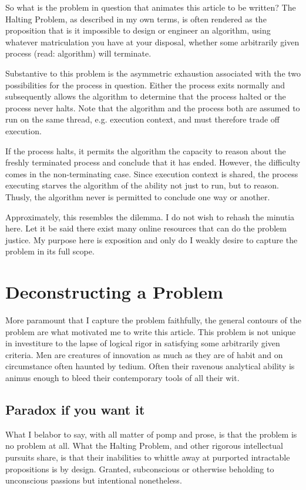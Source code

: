 \documentclass{article}
\begin{document}
	So what is the problem in question that animates this article to be written? The Halting Problem, as described in my own terms, is often rendered as the proposition that is it impossible to design or engineer an algorithm, using whatever matriculation you have at your disposal, whether some arbitrarily given process (read: algorithm) will terminate.
	
	Substantive to this problem is the asymmetric exhaustion associated with the two possibilities for the process in question. Either the process exits normally and subsequently allows the algorithm to determine that the process halted or the process never halts. Note that the algorithm and the process both are assumed to run on the same thread, e.g. execution context, and must therefore trade off execution.
	
	If the process halts, it permits the algorithm the capacity to reason about the freshly terminated process and conclude that it has ended. However, the difficulty comes in the non-terminating case. Since execution context is shared, the process executing starves the algorithm of the ability not just to run, but to reason. Thusly, the algorithm never is permitted to conclude one way or another.
	
	Approximately, this resembles the dilemma. I do not wish to rehash the minutia here. Let it be said there exist many online resources that can do the problem justice. My purpose here is exposition and only do I weakly desire to capture the problem in its full scope.
	
	\section{Deconstructing a Problem}
	
	More paramount that I capture the problem faithfully, the general contours of the problem are what motivated me to write this article. This problem is not unique in investiture to the lapse of logical rigor in satisfying some arbitrarily given criteria. Men are creatures of innovation as much as they are of habit and on circumstance often haunted by tedium. Often their ravenous analytical ability is animus enough to bleed their contemporary tools of all their wit.
	
	\subsection{Paradox if you want it}
	What I belabor to say, with all matter of pomp and prose, is that the problem is no problem at all. What the Halting Problem, and other rigorous intellectual pursuits share, is that their inabilities to whittle away at purported intractable propositions is by design. Granted, subconscious or otherwise beholding to unconscious passions but intentional nonetheless.
	
\end{document}
